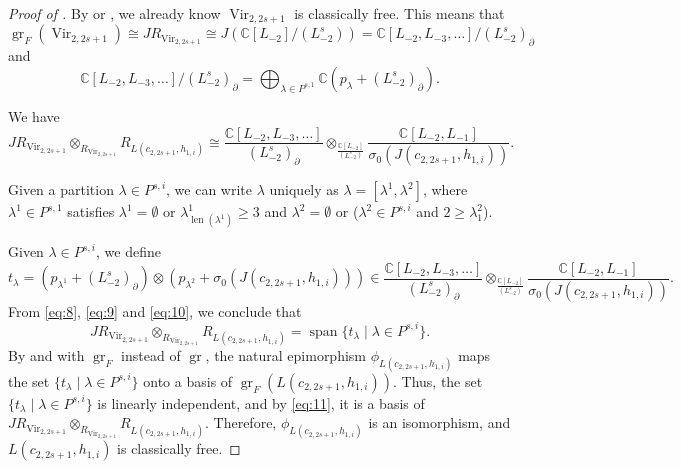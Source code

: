 \documentclass[a4paper, 12pt, reqno]{amsart}
\theoremstyle{remark}
\DeclareMathOperator{\Vir}{Vir}
\DeclareMathOperator{\len}{len}
\DeclareMathOperator{\gr}{gr}
\DeclareMathOperator{\vspan}{span}
\begin{document}
\begin{proof}[Proof of ]
  By \cite{van_ekeren_chiral_2021} or \cite{bruschek_arc_2013}, we already know $\Vir_{2, 2s + 1}$ is classically free.
  This means that $\gr_F(\Vir_{2, 2s + 1}) \cong JR_{\Vir_{2, 2s + 1}} \cong J(\mathbb{C}[L_{-2}]/(L_{-2}^s)) = \mathbb{C}[L_{-2}, L_{-3}, \dots]/(L_{-2}^s)_{\partial}$ and
  \begin{equation}
    \label{eq:9}
    \mathbb{C}[L_{-2}, L_{-3}, \dots]/(L_{-2}^s)_{\partial} = \bigoplus_{\lambda \in P^{s, 1}}\mathbb{C}(p_{\lambda} + (L_{-2}^s)_{\partial}).
  \end{equation}

  We have
  \begin{equation}
    \label{eq:10}
    JR_{\Vir_{2, 2s + 1}} \otimes_{R_{\Vir_{2, 2s + 1}}} R_{L(c_{2, 2s + 1}, h_{1, i})} \cong \frac{\mathbb{C}[L_{-2}, L_{-3}, \dots]}{(L_{-2}^s)_{\partial}} \otimes_{\frac{\mathbb{C}[L_{-2}]}{(L_{-2}^s)}}\frac{\mathbb{C}[L_{-2}, L_{-1}]}{\sigma_0(J(c_{2, 2s + 1}, h_{1, i}))}.
  \end{equation}

  Given a partition $\lambda \in P^{s, i}$, we can write $\lambda$ uniquely as $\lambda = [\lambda^1, \lambda^2]$, where $\lambda^1 \in P^{s, 1}$ satisfies $\lambda^1 = \emptyset$ or $\lambda^1_{\len(\lambda^1)} \ge 3$ and $\lambda^2 = \emptyset$ or ($\lambda^2 \in P^{s, i}$ and $2 \ge \lambda^2_1$).

  Given $\lambda \in P^{s, i}$, we define
  \begin{equation*}
    t_{\lambda} = (p_{\lambda^1} + (L_{-2}^s)_{\partial})\otimes(p_{\lambda^2} + \sigma_0(J(c_{2, 2s + 1}, h_{1, i}))) \in \frac{\mathbb{C}[L_{-2}, L_{-3}, \dots]}{(L_{-2}^s)_{\partial}} \otimes_{\frac{\mathbb{C}[L_{-2}]}{(L_{-2}^s)}} \frac{\mathbb{C}[L_{-2}, L_{-1}]}{\sigma_0(J(c_{2, 2s + 1}, h_{1, i}))}.
  \end{equation*}
  From \eqref{eq:8}, \eqref{eq:9} and \eqref{eq:10}, we conclude that
  \begin{equation}
    \label{eq:11}
    JR_{\Vir_{2, 2s + 1}} \otimes_{R_{\Vir_{2, 2s + 1}}} R_{L(c_{2, 2s + 1}, h_{1, i})} = \vspan\{t_{\lambda} \mid \lambda \in P^{s, i}\}.
  \end{equation}
  By  and  with $\gr_F$ instead of $\gr$, the natural epimorphism $\phi_{L(c_{2, 2s + 1}, h_{1, i})}$ maps the set $\{t_{\lambda} \mid \lambda \in P^{s, i}\}$ onto a basis of $\gr_F(L(c_{2, 2s + 1}, h_{1, i}))$.
  Thus, the set $\{t_{\lambda} \mid \lambda \in P^{s, i}\}$ is linearly independent, and by \eqref{eq:11}, it is a basis of $JR_{\Vir_{2, 2s + 1}} \otimes_{R_{\Vir_{2, 2s + 1}}} R_{L(c_{2, 2s + 1}, h_{1, i})}$.
  Therefore, $\phi_{L(c_{2, 2s + 1}, h_{1, i})}$ is an isomorphism, and $L(c_{2, 2s + 1}, h_{1, i})$ is classically free.


\end{proof}
\end{document}
